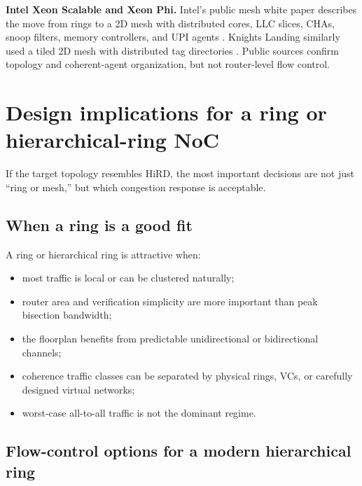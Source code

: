 \documentclass[11pt]{article}
\newcommand{\term}[1]{\textbf{#1}}
\begin{document}
\term{Intel Xeon Scalable and Xeon Phi.} Intel's public mesh white paper describes the move from rings to a 2D mesh with distributed cores, LLC slices, CHAs, snoop filters, memory controllers, and UPI agents \cite{IntelMesh2017}. Knights Landing similarly used a tiled 2D mesh with distributed tag directories \cite{Sodani2015KNL}. Public sources confirm topology and coherent-agent organization, but not router-level flow control.

\section{Design implications for a ring or hierarchical-ring NoC}

If the target topology resembles HiRD, the most important decisions are not just ``ring or mesh,'' but which congestion response is acceptable.

\subsection{When a ring is a good fit}

A ring or hierarchical ring is attractive when:

\begin{itemize}
  \item most traffic is local or can be clustered naturally;
  \item router area and verification simplicity are more important than peak bisection bandwidth;
  \item the floorplan benefits from predictable unidirectional or bidirectional channels;
  \item coherence traffic classes can be separated by physical rings, VCs, or carefully designed virtual networks;
  \item worst-case all-to-all traffic is not the dominant regime.
\end{itemize}

\subsection{Flow-control options for a modern hierarchical ring}
\end{document}
